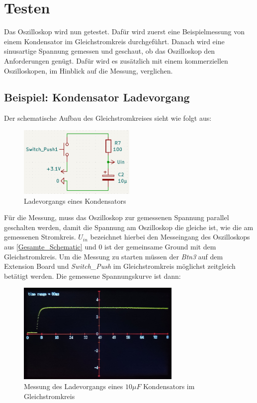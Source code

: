\section{Testen}
\label{Beispiel-Nutzung}

Das Oszilloskop wird nun getestet.
Dafür wird zuerst eine Beispielmessung von einem Kondensator im Gleichstromkreis durchgeführt. \newline
Danach wird eine sinusartige Spannung gemessen und geschaut, ob das Oszilloskop den Anforderungen genügt.
Dafür wird es zusätzlich mit einem kommerziellen Oszilloskopen, im Hinblick auf die Messung, verglichen.

\subsection{Beispiel: Kondensator Ladevorgang}
\label{Kondensator Ladevorgang}
Der schematische Aufbau des Gleichstromkreises sieht wie folgt aus:
\begin{figure}[h]
	\centering
	\includegraphics[width=0.5\textwidth]{images/schematic_beispielnutzung_kondensator2.png}
	\caption{Ladevorgangs eines Kondensators}
\end{figure}
\newline
Für die Messung, muss das Oszilloskop zur gemessenen Spannung parallel geschalten werden,
damit die Spannung am Oszilloskop die gleiche ist, wie die am gemessenen Stromkreis.
$U_{in}$ bezeichnet hierbei den Messeingang des Oszilloskops aus \ref{Gesamte_Schematic}
und $0$ ist der gemeinsame Ground mit dem Gleichstromkreis.
Um die Messung zu starten müssen der \textit{Btn3} auf dem Extension Board und \textit{Switch\_Push}
im Gleichstromkreis möglichst zeitgleich betätigt werden.
Die gemessene Spannungskurve ist dann:
\begin{figure}[h]
	\centering
	\includegraphics[width=0.7\textwidth]{images/messung_kondensator_ladekurve_selbstgebaut2.jpg}
	\caption{Messung des Ladevorgangs eines $10\mu F$ Kondensators im Gleichstromkreis}
\end{figure}
